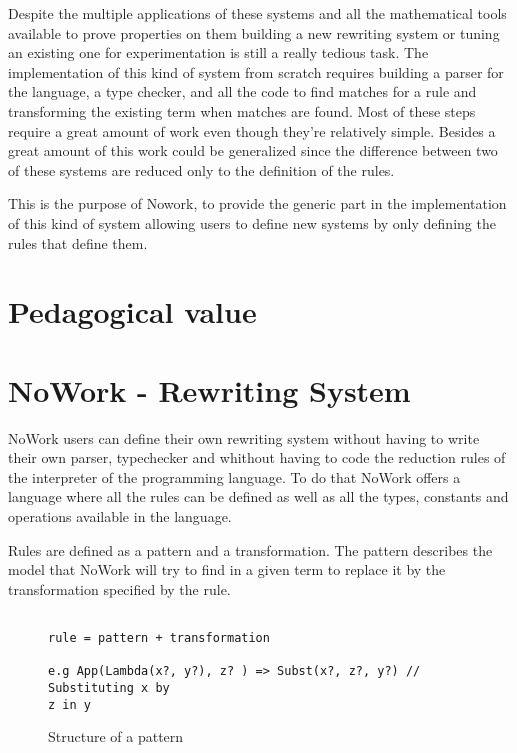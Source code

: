 \documentclass[12pt,a4paper]{article}
\begin{document}
Despite the multiple applications of these systems and all the
mathematical tools available to prove properties on them building a
new rewriting system or tuning an existing one for experimentation is
still a really tedious task. The implementation of this kind of
system from scratch requires building a parser for the language, a
type checker, and all the code to find matches for a rule and
transforming the existing term when matches are found. Most of these
steps require a great amount of work even though they're relatively
simple. Besides a great amount of this work could be generalized since
the difference between two of these systems are reduced only to the
definition of the rules.

This is the purpose of Nowork, to provide the generic part in the
implementation of this kind of system allowing users to define new
systems by only defining the rules that define them.


\section{ Pedagogical value }

\section{ NoWork - Rewriting System }

NoWork users can define their own rewriting system without having to
write their own parser, typechecker and whithout having to code the
reduction rules of the interpreter of the programming language. To do
that NoWork offers a language where all the rules can be defined as
well as all the types, constants and operations available in the
language.

Rules are defined as a pattern  and a transformation. The pattern
describes the model that NoWork will try to find in a given term
to replace it by the transformation specified by the rule.

\begin{figure}[!h]
\begin{verbatim}

rule = pattern + transformation

e.g App(Lambda(x?, y?), z? ) => Subst(x?, z?, y?) // Substituting x by
z in y
\end{verbatim}
\caption{Structure of a pattern}
\end{figure}
\end{document}
